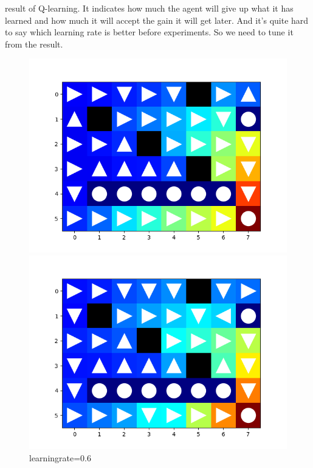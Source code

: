 \documentclass[aps,letterpaper,10pt]{revtex4}
\begin{document}
\begin{enumerate}
        result of Q-learning. It indicates how much the agent will 
        give up what it has learned and how much it will accept the 
        gain it will get later. And it's quite hard to say which learning rate is better 
        before experiments. So we need to tune it from the result.\\ 
        \begin{figure}[htbp] 
            \centering 
            \begin{minipage}[t]{0.5\linewidth}
            \centering 
            \includegraphics[scale=0.5]{a=6.png} 
            \caption{learningrate=0.6} 
            \end{minipage}%
            \begin{minipage}[t]{0.5\linewidth} 
            \centering 
            \includegraphics[scale=0.5]{a=7.png} 

\end{minipage}
\end{figure}
\end{enumerate}
\end{document}
